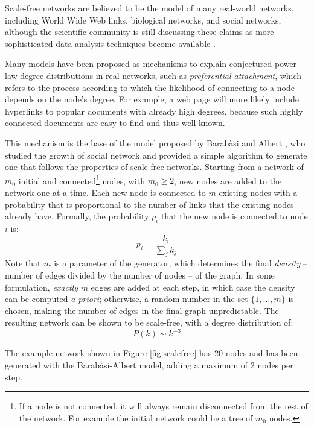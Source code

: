\documentclass[11pt, twoside, titlepage, a4paper, openright]{report}
\begin{document}
\noindent Scale-free networks are believed to be the model of many real-world networks, including World Wide Web links, biological networks, and social networks, although the scientific community is still discussing these claims as more sophisticated data analysis techniques become available \cite{Clauset:SIAM2007}. 

Many models have been proposed as mechanisms to explain conjectured power law degree distributions in real networks, such as \textit{preferential attachment}, which refers to the process according to which the likelihood of connecting to a node depends on the node’s degree. For example, a web page will more likely include hyperlinks to popular documents with already high degrees, because such highly connected documents are easy to find and thus well known.

\noindent This mechanism is the base of the model proposed by Barabàsi and Albert \cite{2002RvMP...74...47A}, who studied the growth of social network and provided a simple algorithm to generate one that follows the properties of scale-free networks.
Starting from a network of $m_0$ initial and connected\footnote{If a node is not connected, it will always remain disconnected from the rest of the network. For example the initial network could be a tree of $m_0$ nodes.} nodes, with $m_0 \geq 2$, new nodes are added to the network one at a time. Each new node is connected to $m$ existing nodes with a probability that is proportional to the number of links that the existing nodes already have. Formally, the probability $p_i$ that the new node is connected to node $i$ is:
$$p_i = \frac{k_i}{\sum_j k_j}$$
Note that $m$ is a parameter of the generator, which determines the final \textit{density} -- number of edges divided by the number of nodes -- of the graph. In some formulation, \textit{exactly} $m$ edges are added at each step, in which case the density can be computed \textit{a priori}; otherwise, a random number in the set $\{1,\ldots,m\}$ is chosen, making the number of edges in the final graph unpredictable. The resulting network can be shown to be scale-free, with a degree distribution of: 
$$P\left(k\right)\sim k^{-3}$$

\noindent The example network shown in Figure \ref{fig:scalefree} has 20 nodes and has been generated with the Barabàsi-Albert model, adding a maximum of 2 nodes per step.
\end{document}
